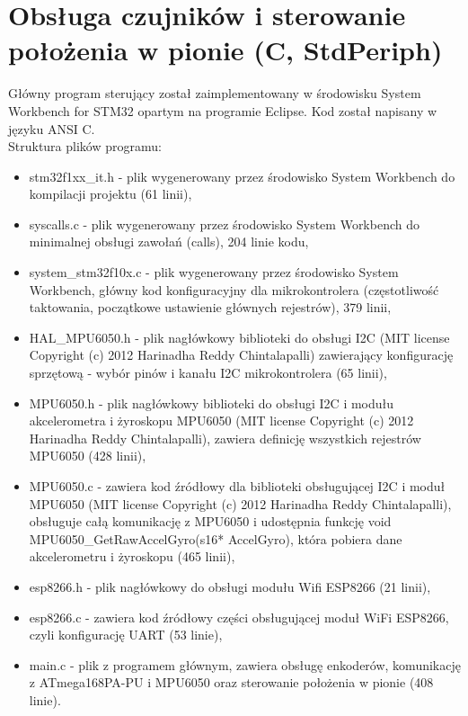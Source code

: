 \documentclass[a4paper,12pt,twoside,openany]{report}
\begin{document}
\section{Obsługa czujników i sterowanie położenia w pionie (C, StdPeriph)}

Główny program sterujący został zaimplementowany w środowisku System Workbench for STM32 opartym na programie Eclipse. Kod został napisany w języku ANSI C. \\
Struktura plików programu:
\begin{itemize}
\item stm32f1xx\_it.h - plik wygenerowany przez środowisko System Workbench do kompilacji projektu (61 linii),
\item syscalls.c - plik wygenerowany przez środowisko System Workbench do minimalnej obsługi zawołań (calls), 204 linie kodu,
\item system\_stm32f10x.c - plik wygenerowany przez środowisko System Workbench, główny kod konfiguracyjny dla mikrokontrolera (częstotliwość taktowania, początkowe ustawienie głównych rejestrów), 379 linii,
\item HAL\_MPU6050.h - plik nagłówkowy biblioteki do obsługi I2C (MIT license Copyright (c) 2012 Harinadha Reddy Chintalapalli) zawierający konfigurację sprzętową - wybór pinów i kanału I2C mikrokontrolera (65 linii),
\item MPU6050.h - plik nagłówkowy biblioteki do obsługi I2C i modułu akcelerometra i żyroskopu MPU6050 (MIT license Copyright (c) 2012 Harinadha Reddy Chintalapalli), zawiera definicję wszystkich rejestrów MPU6050 (428 linii),
\item MPU6050.c - zawiera kod źródłowy dla biblioteki obsługującej 	I2C i moduł MPU6050 (MIT license Copyright (c) 2012 Harinadha Reddy Chintalapalli), obsługuje całą komunikację z MPU6050 i udostępnia funkcję void MPU6050\_GetRawAccelGyro(s16* AccelGyro), która pobiera dane akcelerometru i żyroskopu (465 linii),
\item esp8266.h - plik nagłówkowy do obsługi modułu Wifi ESP8266 (21 linii),
\item esp8266.c - zawiera kod źródłowy części obsługującej moduł WiFi ESP8266, czyli konfigurację UART (53 linie),
\item main.c - plik z programem głównym, zawiera obsługę enkoderów, komunikację z ATmega168PA-PU i MPU6050 oraz sterowanie położenia w pionie (408 linie).
\end{itemize}
\end{document}
